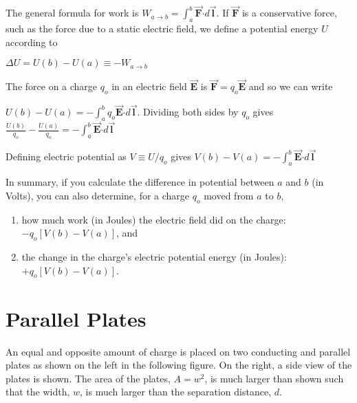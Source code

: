 \documentclass{article}
\newcommand{\ds}[0]{\displaystyle}
\newcommand{\bfvec}[1]{\vec{\mathbf{#1}}}
\newcommand{\bfcdot}[0]{\boldsymbol{\cdot}}
\begin{document}
The general formula for work is $W_{a\rightarrow b}=\int_a^b \bfvec{F}\bfcdot d\bfvec{l}$. If $\bfvec{F}$ is a conservative force, such as the force due to a static electric field, we define a potential energy $U$ according to

$\Delta U = U(b)-U(a) \equiv -W_{a\rightarrow b}$

The force on a charge $q_o$ in an electric field $\bfvec{E}$ is $\bfvec{F}=q_o\bfvec{E}$ and so we can write

$\ds U(b)-U(a) = -\int_a^b q_o\bfvec{E}\bfcdot d\bfvec{l}$. Dividing both sides by $q_o$ gives $\ds\frac{U(b)}{q_o}-\frac{U(a)}{q_o} = -\int_a^b\bfvec{E}\bfcdot d\bfvec{l}$

Defining electric potential as $V\equiv U/q_o$ gives $V(b)-V(a) = -\int_a^b\bfvec{E}\bfcdot d\bfvec{l}$

In summary, if you calculate the difference in potential between $a$ and $b$ (in Volts), you can also determine, for a charge $q_o$ moved from $a$ to $b$,

\begin{enumerate}

  \item how much work (in Joules) the electric field did on the charge: $-q_o[V(b)-V(a)]$, and

  \item the change in the charge's electric potential energy (in Joules): $+q_o[V(b)-V(a)]$.

\end{enumerate}

\ifsolutions\else
\newpage
\fi

\section{Parallel Plates}

An equal and opposite amount of charge is placed on two conducting and parallel plates as shown on the left in the following figure. On the right, a side view of the plates is shown. The area of the plates, $A = w^2$, is much larger than shown such that the width, $w$, is much larger than the separation distance, $d$.


\end{document}
